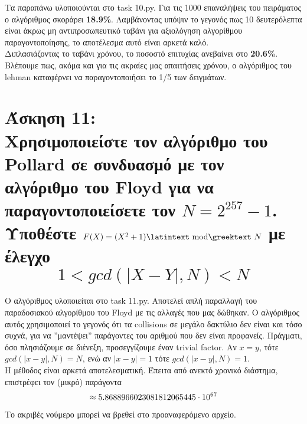\documentclass{article}
\newcommand{\lt}[1]{\latintext #1\greektext}
\newcommand{\task}[2]{\newpage\section*{Άσκηση #1:\\#2}}
\begin{document}
{    Τα παραπάνω υλοποιούνται στο \lt{task 10.py}. Για τις 1000 επαναλήψεις του πειράματος ο αλγόριθμος σκοράρει \textbf{18.9\%}. Λαμβάνοντας υπόψιν το γεγονός πως 10 δευτερόλεπτα είναι άκρως μη αντιπροσωπευτικό ταβάνι για αξιολόγηση αλγορίθμου παραγοντοποίησης, το αποτέλεσμα αυτό είναι αρκετά καλό.\\

    Διπλασιάζοντας το ταβάνι χρόνου, το ποσοστό επιτυχίας ανεβαίνει στο \textbf{20.6\%}. Βλέπουμε πως, ακόμα και για τις ακραίες μας απαιτήσεις χρόνου, ο αλγόριθμος του \lt{lehman} καταφέρνει να παραγοντοποιήσει το 1/5 των δειγμάτων.
}

\task{11}{
    Χρησιμοποιείστε τον αλγόριθμο του \lt{Pollard} σε συνδυασμό με τον αλγόριθμο του \lt{Floyd} για να παραγοντοποιείσετε τον $N = 2^{257} - 1$.
    Υποθέστε $F(X) = (X^2 + 1)\text{\lt{ mod} $N$}$ με έλεγχο
    \[1 < gcd(|X - Y|, N) < N\]
}
{
    Ο αλγόριθμος υλοποιείται στο \lt{task 11.py}. Αποτελεί απλή παραλλαγή του παραδοσιακού αλγορίθμου του \lt{Floyd} με τις αλλαγές που μας δώθηκαν. Ο αλγόριθμος αυτός χρησιμοποιεί το γεγονός ότι τα \lt{collisions} σε μεγάλο δακτύλιο δεν είναι και τόσο συχνά, για να ''μαντέψει'' παράγοντες του αριθμού που δεν είναι προφανείς. Πράγματι, όσο πλησιάζουμε σε διένεξη, προσεγγίζουμε έναν \lt{trivial factor}. Αν $x = y$, τότε $gcd(|x - y|, N) = N$, ενώ αν $|x - y| = 1$ τότε $gcd(|x - y|, N) = 1$.\\
    
    Η μέθοδος είναι αρκετά αποτελεσματική. Έπειτα από ανεκτό χρονικό διάστημα, επιστρέφει τον (μικρό) παράγοντα
    \begin{equation*}
        \approx 5.8688966023081812065445\cdot10^{67}\\
    \end{equation*}
    Το ακριβές νούμερο μπορεί να βρεθεί στο προαναφερόμενο αρχείο.
}
\end{document}
